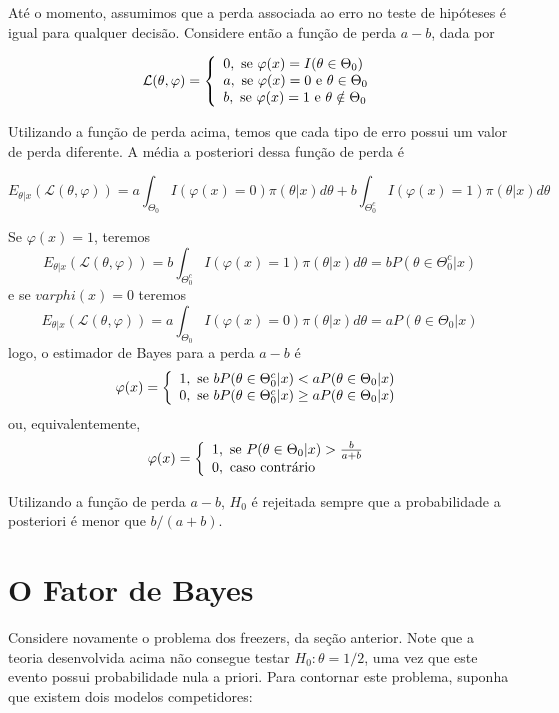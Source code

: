 \documentclass[
  letterpaper,
  DIV=11,
  numbers=noendperiod]{scrreprt}
\theoremstyle{plain}
\theoremstyle{definition}
\theoremstyle{definition}
\theoremstyle{remark}
\begin{document}
Até o momento, assumimos que a perda associada ao erro no teste de
hipóteses é igual para qualquer decisão. Considere então a função de
perda \(a-b\), dada por

\[\mathcal{L}(\theta,\varphi)=\left\{\begin{array}{l}0,\hbox{ se }\varphi(x)=I(\theta\in\Theta_0)\\
a,\hbox{ se }\varphi(x)=0\hbox{ e }\theta\in\Theta_0\\b,\hbox{ se }\varphi(x)=1\hbox{ e }\theta\notin\Theta_0\end{array}\right.\]

Utilizando a função de perda acima, temos que cada tipo de erro possui
um valor de perda diferente. A média a posteriori dessa função de perda
é

\[E_{\theta|x}(\mathcal{L}(\theta,\varphi))=a\int_{\Theta_0}I(\varphi(x)=0)\pi(\theta|x)d\theta+b\int_{\Theta_0^c}I(\varphi(x)=1)\pi(\theta|x)d\theta\]

Se \(\varphi(x)=1\), teremos
\[E_{\theta|x}(\mathcal{L}(\theta,\varphi))=b\int_{\Theta_0^c}I(\varphi(x)=1)\pi(\theta|x)d\theta=bP(\theta\in\Theta_0^c|x)\]
e se \(varphi(x)=0\) teremos
\[E_{\theta|x}(\mathcal{L}(\theta,\varphi))=a\int_{\Theta_0}I(\varphi(x)=0)\pi(\theta|x)d\theta=aP(\theta\in\Theta_0|x)\]
logo, o estimador de Bayes para a perda \(a-b\) é
\[\varphi(x)=\left\{\begin{array}{l}1,\hbox{ se }bP(\theta\in\Theta_0^c|x)<aP(\theta\in\Theta_0|x)\\
0,\hbox{ se }bP(\theta\in\Theta_0^c|x)\geq aP(\theta\in\Theta_0|x)\end{array}\right.\]
ou, equivalentemente,
\[\varphi(x)=\left\{\begin{array}{l}1,\hbox{ se }P(\theta\in\Theta_0|x)>\frac{b}{a+b}\\
0,\hbox{ caso contrário}\end{array}\right.\]

Utilizando a função de perda \(a-b\), \(H_0\) é rejeitada sempre que a
probabilidade a posteriori é menor que \(b/(a+b)\).


\chapter{O Fator de Bayes}\label{o-fator-de-bayes}

Considere novamente o problema dos freezers, da seção anterior. Note que
a teoria desenvolvida acima não consegue testar \(H_0:\theta=1/2\), uma
vez que este evento possui probabilidade nula a priori. Para contornar
este problema, suponha que existem dois modelos competidores:
\end{document}
